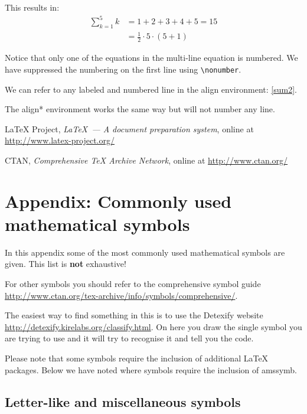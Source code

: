 \documentclass[a4paper,14pt]{extarticle}
\begin{document}
This results in:
\begin{align}
\sum_{k=1}^5 k &= 1 + 2 + 3 + 4 + 5 = 15 \nonumber\\
\label{sum2}
&= \frac{1}{2}\cdot 5 \cdot (5+1)
\end{align}

Notice that only one of the equations in the multi-line equation is numbered. We have suppressed the numbering on the first line using \verb=\nonumber=. 

We can refer to any labeled and numbered line in the align environment: \eqref{sum2}.

The align* environment works the same way but will not number any line. 




\begin{thebibliography}{99}
LaTeX Project, \emph{\LaTeX\ --- A document preparation system}, 
online at \url{http://www.latex-project.org/}

CTAN, \emph{Comprehensive TeX Archive Network}, online at \url{http://www.ctan.org/}

\end{thebibliography}

\newpage




\section{Appendix: Commonly used mathematical symbols}
In this appendix some of the most commonly used mathematical symbols are given. This list is \textbf{not} exhaustive! 

For other symbols you should refer to the comprehensive symbol guide \url{http://www.ctan.org/tex-archive/info/symbols/comprehensive/}. 

The easiest way to find something in this is to use the Detexify website \url{http://detexify.kirelabs.org/classify.html}. On here you draw the single symbol you are trying to use and it will try to recognise it and tell you the code. 

Please note that some symbols require the inclusion of additional \LaTeX~ packages. Below we have noted where symbols require the inclusion of amssymb.

\subsection{Letter-like and miscellaneous symbols}
\end{document}

